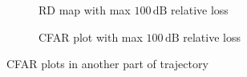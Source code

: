 \documentclass[12pt,DIV14,BCOR12mm,a4paper,footinclude=false,headinclude,parskip=half-,twoside,openright,cleardoublepage=empty,toc=index,bibliography=totoc,listof=totoc]{scrreprt}
\numberwithin{equation}{chapter}
\begin{document}
\begin{figure}[t]
        \begin{subfigure}{0.45\textwidth}
            \centering
            \caption{RD map with max $100\,\mathrm{dB}$ relative loss}
        \end{subfigure}\hspace{0.5cm}
        \begin{subfigure}{0.45\textwidth}
            \centering
            \caption{CFAR plot with max $100\,\mathrm{dB}$ relative loss}
        \end{subfigure}
        \caption{CFAR plots in another part of trajectory}
        \label{CFAR plots in another part of trajectory}
\end{figure}
\end{document}
